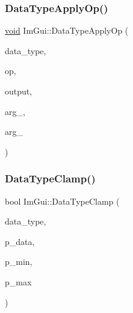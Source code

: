 \mbox{\label{namespaceImGui_ad8428ae139bf4e90fda66ab60476a13c}} 
\subsubsection{\texorpdfstring{Data\+Type\+Apply\+Op()}{DataTypeApplyOp()}}
{\footnotesize\ttfamily \hyperlink{imgui__impl__opengl3__loader_8h_ac668e7cffd9e2e9cfee428b9b2f34fa7}{void} Im\+Gui\+::\+Data\+Type\+Apply\+Op (\begin{DoxyParamCaption}\item[{Im\+Gui\+Data\+Type}]{data\+\_\+type,  }\item[{int}]{op,  }\item[{\hyperlink{imgui__impl__opengl3__loader_8h_ac668e7cffd9e2e9cfee428b9b2f34fa7}{void} $\ast$}]{output,  }\item[{const \hyperlink{imgui__impl__opengl3__loader_8h_ac668e7cffd9e2e9cfee428b9b2f34fa7}{void} $\ast$}]{arg\+\_,  }\item[{const \hyperlink{imgui__impl__opengl3__loader_8h_ac668e7cffd9e2e9cfee428b9b2f34fa7}{void} $\ast$}]{arg\+\_ }\end{DoxyParamCaption})}

\mbox{\label{namespaceImGui_adf9cbe8f8af33cba51b481e9b99cca1a}} 
\subsubsection{\texorpdfstring{Data\+Type\+Clamp()}{DataTypeClamp()}}
{\footnotesize\ttfamily bool Im\+Gui\+::\+Data\+Type\+Clamp (\begin{DoxyParamCaption}\item[{Im\+Gui\+Data\+Type}]{data\+\_\+type,  }\item[{\hyperlink{imgui__impl__opengl3__loader_8h_ac668e7cffd9e2e9cfee428b9b2f34fa7}{void} $\ast$}]{p\+\_\+data,  }\item[{const \hyperlink{imgui__impl__opengl3__loader_8h_ac668e7cffd9e2e9cfee428b9b2f34fa7}{void} $\ast$}]{p\+\_\+min,  }\item[{const \hyperlink{imgui__impl__opengl3__loader_8h_ac668e7cffd9e2e9cfee428b9b2f34fa7}{void} $\ast$}]{p\+\_\+max }\end{DoxyParamCaption})}

